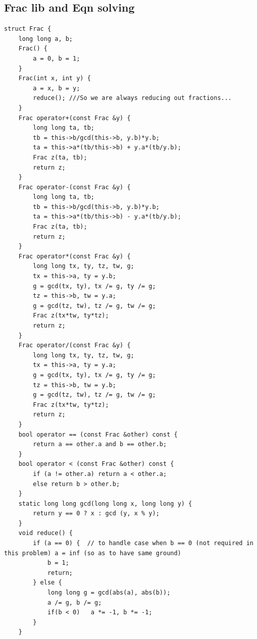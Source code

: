 \documentclass[8pt, a4paper, oneside, twocolumn]{extarticle}
\begin{document}
\subsection{Frac lib and Eqn solving}
\begin{verbatim}
struct Frac {
    long long a, b;
    Frac() {
        a = 0, b = 1;
    }
    Frac(int x, int y) {
        a = x, b = y;
        reduce(); ///So we are always reducing out fractions...
    }
    Frac operator+(const Frac &y) {
        long long ta, tb;
        tb = this->b/gcd(this->b, y.b)*y.b;
        ta = this->a*(tb/this->b) + y.a*(tb/y.b);
        Frac z(ta, tb);
        return z;
    }
    Frac operator-(const Frac &y) {
        long long ta, tb;
        tb = this->b/gcd(this->b, y.b)*y.b;
        ta = this->a*(tb/this->b) - y.a*(tb/y.b);
        Frac z(ta, tb);
        return z;
    }
    Frac operator*(const Frac &y) {
        long long tx, ty, tz, tw, g;
        tx = this->a, ty = y.b;
        g = gcd(tx, ty), tx /= g, ty /= g;
        tz = this->b, tw = y.a;
        g = gcd(tz, tw), tz /= g, tw /= g;
        Frac z(tx*tw, ty*tz);
        return z;
    }
    Frac operator/(const Frac &y) {
        long long tx, ty, tz, tw, g;
        tx = this->a, ty = y.a;
        g = gcd(tx, ty), tx /= g, ty /= g;
        tz = this->b, tw = y.b;
        g = gcd(tz, tw), tz /= g, tw /= g;
        Frac z(tx*tw, ty*tz);
        return z;
    }
    bool operator == (const Frac &other) const {
        return a == other.a and b == other.b;
    }
    bool operator < (const Frac &other) const {
        if (a != other.a) return a < other.a;
        else return b > other.b;
    }
    static long long gcd(long long x, long long y) {
        return y == 0 ? x : gcd (y, x % y);
    }
    void reduce() {
        if (a == 0) {  // to handle case when b == 0 (not required in this problem) a = inf (so as to have same ground)
            b = 1;
            return;
        } else {
            long long g = gcd(abs(a), abs(b));
            a /= g, b /= g;
            if(b < 0)   a *= -1, b *= -1;
        }
    }


\end{verbatim}
\end{document}
